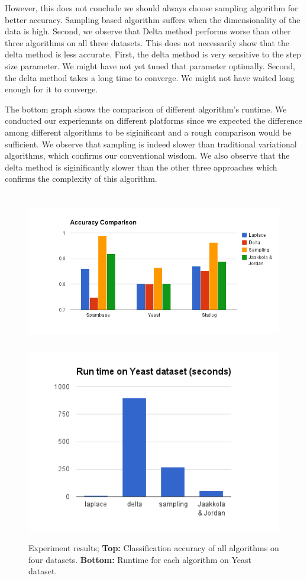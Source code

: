 However, this does not conclude
we should always choose sampling algorithm for better accuracy. Sampling based
algorithm suffers when the dimensionality of the data is high. Second, we
observe that Delta method performs worse than other three algorithms on all
three datasets. This does not necessarily show that the delta method is less
accurate. First, the delta method is very sensitive to the step size
parameter. We might have not yet tuned that parameter optimally. Second, the
delta method takes a long time to converge. We might not have waited long
enough for it to converge.

The bottom graph shows the comparison of different algorithm's runtime. We
conducted our experiemnts on different platforms since we expected the
difference among different algorithms to be siginificant and a rough
comparison would be sufficient. We observe that sampling is indeed slower than
traditional variational algorithms, which confirms our conventional wisdom. We
also observe that the delta method is siginificantly slower than the other
three approaches which confirms the complexity of this algorithm.

\begin{figure}[t]
\centering
\includegraphics[height=7.0cm]{results/accuracy_comp.png}
\includegraphics[height=8.0cm]{results/speed_comp.png}

\caption{\small Experiment results; {\bf Top:} Classification accuracy of all algorithms on
four datasets. {\bf Bottom:} Runtime for each algorithm on Yeast dataset. }
\label{fig:results}
\end{figure}

